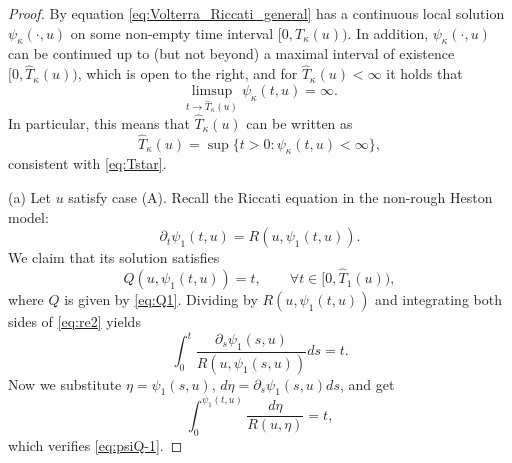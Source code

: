 \documentclass[12pt,a4paper]{amsart}
\numberwithin{equation}{section}
\numberwithin{equation}{section}
\theoremstyle{nonumberplain}
\begin{document}
\begin{proof} By \cite[Thm.~12.11]{gripenberg1990volterra} equation \eqref{eq:Volterra_Riccati_general} has a continuous local solution $\psi_\kappa(\cdot,u)$ on some non-empty time interval $[0,T_\kappa(u))$. In addition, $\psi_\kappa(\cdot,u)$ can be continued up to (but not beyond) a maximal interval of existence $[0,\hat{T}_\kappa(u))$, which is open to the right, and for $\hat{T}_\kappa(u) < \infty $ it holds that 
\begin{equation}\label{eq:limsup_psi_alpha}
 \limsup_{t \to \hat{T}_\kappa(u) } \psi_\kappa(t,u) = \infty.
\end{equation}
In particular, this means that $\hat{T}_\kappa(u)$ can be written as 
\[\hat{T}_\kappa(u) = \sup\{t > 0: \psi_\kappa(t,u) < \infty\},\]
consistent with \eqref{eq:Tstar}.

(a) Let $u$ satisfy case (A). Recall the Riccati equation in the non-rough Heston model:
	\begin{equation}\label{eq:re2}
		\partial_t \psi_1(t,u) = R(u,\psi_1(t,u)).
	\end{equation}
	We claim that its solution satisfies
	\begin{equation}\label{eq:psiQ-1}
		Q(u,\psi_1(t,u)) = t, \qquad \forall t \in [0,\hat{T}_1(u)),
	\end{equation} 
	where $Q$ is given by \eqref{eq:Q1}. Dividing by $R(u,\psi_1(t,u))$ and integrating both sides of \eqref{eq:re2} yields
	\begin{equation*}
		\int_0^t \frac{\partial_s \psi_1(s,u)}{R(u,\psi_1(s,u))} ds = t.
	\end{equation*}
	Now we substitute $ \eta = \psi_1(s,u) $, $d\eta = \partial_s \psi_1(s,u) ds $, and get
	\begin{equation}\label{eq:subst}
		\int_0^{\psi_1(t,u)} \frac{d\eta}{R(u,\eta)} = t,
	\end{equation}
	which verifies \eqref{eq:psiQ-1}.
	

\end{proof}
\end{document}
